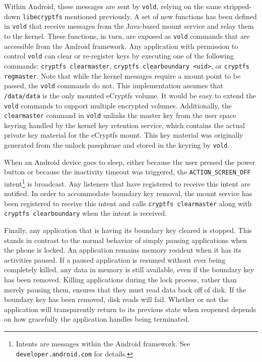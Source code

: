 Within Android, these messages are sent by \texttt{vold}, relying on the same stripped-down \texttt{libecryptfs} mentioned
previously.  A set of new functions has been defined in \texttt{vold} that receive messages from the Java-based mount service and
relay them to the kernel. These functions, in turn, are exposed as \texttt{vold} commands that are accessible from the Android
framework. Any application with permission to control \texttt{vold} can clear or re-register keys by executing one of the following
commands: \texttt{cryptfs clearmaster}, \texttt{cryptfs clearboundary <uid>}, or \texttt{cryptfs regmaster}. Note that while the
kernel messages require a mount point to be passed, the \texttt{vold} commands do not. This implementation assumes that
\texttt{/data/data} is the only mounted eCryptfs volume. It would be easy to extend the \texttt{vold} commands to support
multiple encrypted volumes. Additionally, the \texttt{clearmaster} command in \texttt{vold} unlinks the master key from the
user space keyring
handled by the kernel key retention service, which contains the actual private key material for the eCryptfs mount. This key
material was originally generated from the unlock passphrase and stored in the keyring by \texttt{vold}.

When an Android device goes to sleep, either because the user pressed the power button or because the inactivity timeout was
triggered, the \texttt{ACTION\_SCREEN\_OFF} intent\footnote{Intents are messages within the Android framework. See
\texttt{developer.android.com} for details.} is broadcast. Any listeners that have registered to receive this intent are notified.
In order to accommodate boundary key removal, the mount service has been registered to receive this intent and calls \texttt{cryptfs
clearmaster} along with \texttt{cryptfs clearboundary} when the intent is received. 

Finally, any application that is having its boundary key cleared is stopped. This stands in contrast to the normal behavior
of simply pausing applications when the phone is locked. An application remains memory resident when it has its activities paused.
If a paused application is resumed without ever being completely killed, any data in memory is still available, even if the boundary key
has been removed. Killing applications during the lock process, rather than merely pausing them, ensures that they must
read data back off of disk. If the boundary key has been removed, disk reads will fail. Whether or not the application will
transparently return to its previous state when reopened depends on how gracefully the application handles being terminated. 

